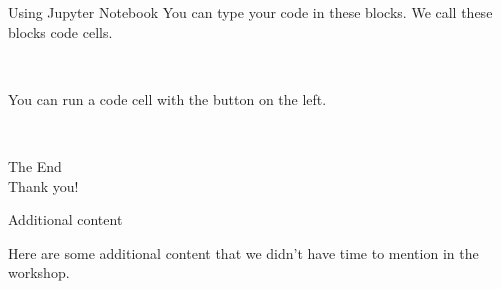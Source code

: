 \documentclass[dvipsnames, svgnames, x11names, handout]{beamer}
\begin{document}
\begin{frame}[fragile]{Using Jupyter Notebook}
    You can type your code in these blocks. We call these blocks code cells.

    \begin{center}
    \end{center}

    \

    You can run a code cell with the button on the left.

    \begin{center}
    \end{center}
\end{frame}

\begin{frame}{ \ }
	\begin{center}
		The End\\
		Thank you!
	\end{center}
\end{frame}






\setcounter{framenumber}{0}











\begin{frame}{Additional content}
	\begin{center}
		Here are some additional content that we didn't have time to mention in the workshop.
	\end{center}
\end{frame}
\end{document}
